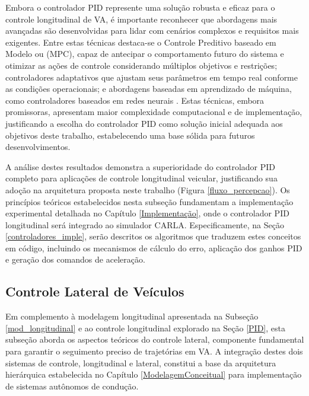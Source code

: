 Embora o controlador PID represente uma solução robusta e eficaz para o controle longitudinal de VA, é importante reconhecer que abordagens mais avançadas são desenvolvidas para lidar com cenários complexos e requisitos mais exigentes. Entre estas técnicas destaca-se o Controle Preditivo baseado em Modelo ou (MPC), capaz de antecipar o comportamento futuro do sistema e otimizar as ações de controle considerando múltiplos objetivos e restrições; controladores adaptativos que ajustam seus parâmetros em tempo real conforme as condições operacionais; e abordagens baseadas em aprendizado de máquina, como controladores baseados em redes neurais \cite{University_of_Toronto2018-fe}. Estas técnicas, embora promissoras, apresentam maior complexidade computacional e de implementação, justificando a escolha do controlador PID como solução inicial adequada aos objetivos deste trabalho, estabelecendo uma base sólida para futuros desenvolvimentos.

A análise destes resultados demonstra a superioridade do controlador PID completo para aplicações de controle longitudinal veicular, justificando sua adoção na arquitetura proposta neste trabalho (Figura \ref{fluxo_percepcao}). Os princípios teóricos estabelecidos nesta subseção fundamentam a implementação experimental detalhada no Capítulo \ref{Implementação}, onde o controlador PID longitudinal será integrado ao simulador CARLA. Especificamente, na Seção \ref{controladores_imple}, serão descritos os algoritmos que traduzem estes conceitos em código, incluindo os mecanismos de cálculo do erro, aplicação dos ganhos PID e geração dos comandos de aceleração. %

\subsection{Controle Lateral de Veículos} \label{intro_controle_lateral}

Em complemento à modelagem longitudinal apresentada na Subseção \ref{mod_longitudinal} e ao controle longitudinal explorado na Seção \ref{PID}, esta subseção aborda os aspectos teóricos do controle lateral, componente fundamental para garantir o seguimento preciso de trajetórias em VA. A integração destes dois sistemas de controle, longitudinal e lateral, constitui a base da arquitetura hierárquica estabelecida no Capítulo \ref{ModelagemConceitual} para implementação de sistemas autônomos de condução.


